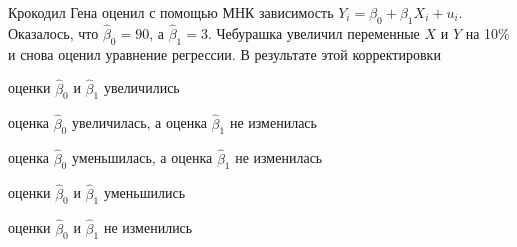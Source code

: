 
\begin{question}
Крокодил Гена оценил с помощью МНК зависимость \(Y_i = \beta_0 + \beta_1 X_i + u_i\). Оказалось, что \(\hat \beta_0 = 90\), а \(\hat\beta_1 = 3\).
Чебурашка увеличил переменные \(X\) и \(Y\) на 10\% и снова оценил уравнение регрессии. В результате этой корректировки
\begin{answerlist}
  \item оценки \(\hat\beta_0\) и \(\hat\beta_1\) увеличились
  \item оценка \(\hat\beta_0\) увеличилась, а оценка \(\hat\beta_1\) не изменилась
  \item оценка \(\hat\beta_0\) уменьшилась, а оценка \(\hat\beta_1\) не изменилась
  \item оценки \(\hat\beta_0\) и \(\hat\beta_1\) уменьшились
  \item оценки \(\hat\beta_0\) и \(\hat\beta_1\) не изменились
\end{answerlist}
\end{question}


